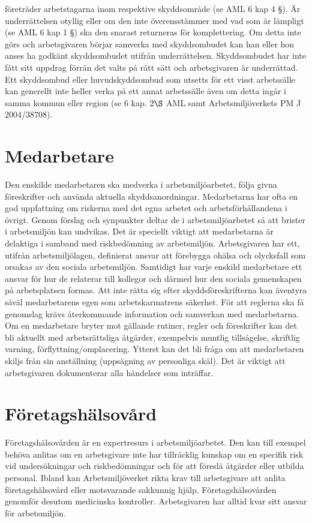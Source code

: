 företräder arbetstagarna inom respektive skyddsområde (se AML 6 kap 4 §). Är underrättelsen otyllig eller om den inte överensstämmer med vad som är lämpligt (se AML 6 kap 1 §) ska den snarast returneras för komplettering. Om detta inte görs och arbetsgivaren börjar samverka med skyddsombudet kan han eller hon anses ha godkänt skyddsombudet utifrån underrättelsen.
Skyddsombudet har inte fått sitt uppdrag förrän det valts på rätt sätt och arbetsgivaren är underrättad. Ett skyddsombud eller huvudskyddsombud som utsetts för ett visst arbetssälle kan generellt inte heller verka på ett annat arbetssälle även om detta ingår i samma kommun eller region (se 6 kap. \(2 \S\) AML samt Arbetsmiljöverkets PM J 2004/38708).
\section*{Medarbetare}
Den enskilde medarbetaren ska medverka i arbetsmiljöarbetet, följa givna föreskrifter och använda aktuella skyddsanordningar. Medarbetarna har ofta en god uppfattning om riskerna med det egna arbetet och arbetsförhållandena i övrigt. Genom förslag och synpunkter deltar de i arbetsmiljöarbetet så att brister i arbetsmiljön kan undvikas. Det är speciellt viktigt att medarbetarna är delaktiga i samband med riskbedömning av arbetsmiljön. Arbetsgivaren har ett, utifrån arbetsmiljölagen, definierat ansvar att förebygga ohälsa och olycksfall som orsaka\(s\) av den sociala arbetsmiljön. Samtidigt har varje enskild medarbetare ett ansvar för hur de relaterar till kollegor och därmed hur den sociala gemenskapen på arbetsplatsen formas.
Att inte rätta sig efter skyddsföreskrifterna kan äventyra såväl medarbetarens egen som arbetskarmatrens säkerhet. För att reglerna ska få genomslag krävs återkommande information och samverkan med medarbetarna. Om en medarbetare bryter mot gällande rutiner, regler och föreskrifter kan det bli aktuellt med arbetsrättsliga åtgärder, exempelvis muntlig tillsågelse, skriftlig varning, förflyttning/omplacering. Ytterst kan det bli fråga om att medarbetaren skiljs från sin anställning (uppsägning av personliga skäl). Det är viktigt att arbetsgivaren dokumenterar alla händelser som inträffar.
\section*{Företagshälsovård}
Företagshälsovården är en expertresurs i arbetsmiljöarbetet. Den kan till exempel behöva anlitas om en arbetsgivare inte har tillräcklig kunskap om en specifik risk vid undersökningar och riskbedömningar och för att föreslä åtgärder eller utbilda personal. Ibland kan Arbetsmiljöverket rikta krav till arbetsgivare att anlita företagshälsovård eller motsvarande sakkunnig hjälp. Företagshälsovården genomför desutom medicinska kontroller. Arbetsgivaren har alltid kvar sitt ansvar för arbetsmiljön.

